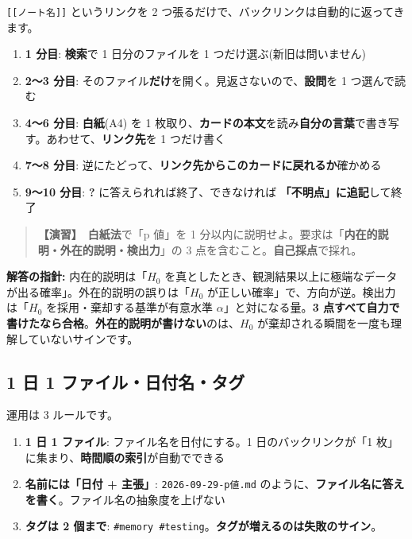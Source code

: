 \documentclass{article}
\begin{document}
\texttt{[[ノート名]]} というリンクを 2 つ張るだけで、バックリンクは自動的に返ってきます。

\begin{enumerate}
\item \textbf{1 分目}: \textbf{検索}で 1 日分のファイルを 1 つだけ選ぶ(新旧は問いません)
\item \textbf{2〜3 分目}: そのファイル\textbf{だけ}を開く。見返さないので、\textbf{設問}を 1 つ選んで読む
\item \textbf{4〜6 分目}: \textbf{白紙}(A4) を 1 枚取り、\textbf{カードの本文}を読み\textbf{自分の言葉}で書き写す。あわせて、\textbf{リンク先}を 1 つだけ書く
\item \textbf{7〜8 分目}: 逆にたどって、\textbf{リンク先からこのカードに戻れるか}確かめる
\item \textbf{9〜10 分目}: \textbf{?} に答えられれば終了、できなければ \textbf{「不明点」に追記}して終了
\end{enumerate}

\begin{quote}
\textbf{【演習】}\ \textbf{白紙法}で「p 値」を 1 分以内に説明せよ。要求は「\textbf{内在的説明・外在的説明・検出力}」の 3 点を含むこと。\textbf{自己採点}で採れ。
\end{quote}

\textbf{解答の指針:} 内在的説明は「\(H_0\) を真としたとき、観測結果以上に極端なデータが出る確率」。外在的説明の誤りは「\(H_0\) が正しい確率」で、方向が逆。検出力は「\(H_0\) を採用・棄却する基準が有意水準 \(\alpha\)」と対になる量。\textbf{3 点すべて自力で書けたなら合格}。\textbf{外在的説明が書けない}のは、\(H_0\) が棄却される瞬間を一度も理解していないサインです。

\subsection{1 日 1 ファイル・日付名・タグ}

運用は 3 ルールです。

\begin{enumerate}
\item \textbf{1 日 1 ファイル}: ファイル名を日付にする。1 日のバックリンクが「1 枚」に集まり、\textbf{時間順の索引}が自動でできる
\item \textbf{名前には「日付 + 主張」}: \texttt{2026-09-29-p値.md} のように、\textbf{ファイル名に答えを書く}。ファイル名の抽象度を上げない
\item \textbf{タグは 2 個まで}: \texttt{\#memory \#testing}。\textbf{タグが増えるのは失敗のサイン}。\end{enumerate}
\end{document}
